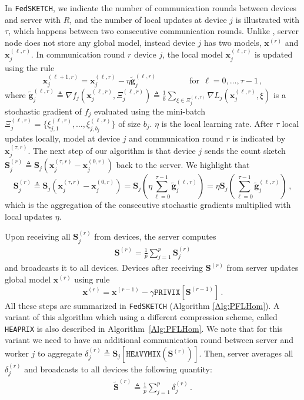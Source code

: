 \documentclass[review,onefignum,onetabnum]{siamart190516}
\begin{document}
In \texttt{FedSKETCH}, we indicate the number of communication rounds between devices and server with $R$, and the number of local updates at device $j$ is illustrated with $\tau$, which happens between two consecutive communication rounds. Unlike \cite{haddadpour2020federated}, server node does not store any global model, instead device $j$ has two models, $\boldsymbol{x}^{(r)}$ and $\boldsymbol{x}^{(\ell,r)}_j$. In communication round $r$ device $j$, the local model $\boldsymbol{x}^{(\ell,r)}_j$ is updated using the rule $$\boldsymbol{x}_j^{(\ell+1,r)}=\boldsymbol{x}_j^{(\ell,r)}-\eta \tilde{\mathbf{g}}_j^{(\ell,r)} \qquad\qquad \text{for}\:\:\ell=0,\ldots,\tau-1\, ,$$
where $\tilde{\mathbf{g}}_j^{(\ell,r)}\triangleq\nabla{f}_j(\boldsymbol{x}_j^{(\ell,r)},\Xi_j^{(\ell,r)})\triangleq\frac{1}{b}\sum_{\xi\in\Xi_j^{(\ell,r)}}\nabla{L}_j(\boldsymbol{x}_j^{(\ell,r)},\xi)$ is a stochastic gradient of $f_j$ evaluated using the mini-batch $\Xi_j^{(\ell,r)}=\{\xi^{(\ell,r)}_{j,1},\ldots,\xi^{(\ell,r)}_{j,b_j} \}$ of size $b_j$. $\eta$ is the local learning rate. After $\tau$ local updates locally, model at device $j$ and communication round $r$ is indicated by $\boldsymbol{x}_j^{(\tau,r)}$. The next step of our algorithm is that device $j$ sends the count sketch $\mathbf{S}_j^{(r)}\triangleq\mathbf{S}_j\left(\boldsymbol{x}_j^{(\tau,r)}-\boldsymbol{x}_j^{(0,r)}\right)$ back to the server. We highlight that $$\mathbf{S}_j^{(r)}\triangleq\mathbf{S}_j\left(\boldsymbol{x}_j^{(\tau,r)}-\boldsymbol{x}_j^{(0,r)}\right)=\mathbf{S}_j\left(\eta\sum_{\ell=0}^{\tau-1}\tilde{\mathbf{g}}_j^{(\ell,r)}\right)=\eta\mathbf{S}_j\left(\sum_{\ell=0}^{\tau-1}\tilde{\mathbf{g}}_j^{(\ell,r)}\right)\, ,$$ which is the aggregation of the consecutive stochastic gradients multiplied with local updates $\eta$.

Upon receiving all $\mathbf{S}_j^{(r)}$ from devices, the server computes \begin{align}\mathbf{S}^{(r)}=\frac{1}{p}\sum_{j=1}^p\mathbf{S}_j^{(r)}\label{eq:average-skestching}
\end{align} and broadcasts it to all devices. Devices after receiving $\mathbf{S}^{(r)}$ from server updates  global model $\boldsymbol{x}^{(r)}$ using rule $$\boldsymbol{x}^{(r)}=\boldsymbol{x}^{(r-1)}-\gamma \texttt{PRIVIX}\left[\mathbf{S}^{(r-1)}\right]\, .$$
All these steps are summarized in \texttt{FedSKETCH} (Algorithm \ref{Alg:PFLHom}). A variant of this algorithm which using a different compression scheme, called \texttt{HEAPRIX} is also described in Algorithm~\ref{Alg:PFLHom}. We note that for this variant we need to have an additional communication round between server and worker $j$ to aggregate $\delta_j^{(r)}\triangleq \mathbf{S}_j\left[\texttt{HEAVYMIX}(\mathbf{S}^{(r)})\right]$. Then, server averages all $\delta^{(r)}_j$ and broadcasts to all devices the following quantity:
\begin{align}
\tilde{\mathbf{S}}^{(r)}\triangleq \frac{1}{p}\sum_{j=1}^p\delta^{(r)}_j \, .\label{eq:glbl-updts}
\end{align}
\end{document}
